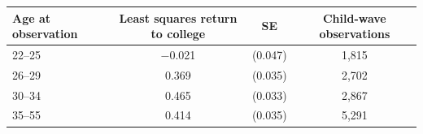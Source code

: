 \begin{tabular}{@{}lccc@{}}
\toprule
Age at observation & Least squares return to college & SE & Child-wave observations \\
\midrule
22--25 & $-$0.021 & (0.047) & 1,815 \\
26--29 & 0.369 & (0.035) & 2,702 \\
30--34 & 0.465 & (0.033) & 2,867 \\
35--55 & 0.414 & (0.035) & 5,291 \\
\bottomrule
\end{tabular}
